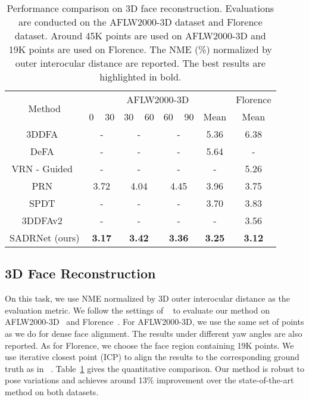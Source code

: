 \documentclass[journal]{IEEEtran}
\begin{document}
	
	\begin{table}[tbp]
		\caption{Performance comparison on 3D face reconstruction. Evaluations are conducted on the AFLW2000-3D dataset and Florence dataset. Around 45K points are used on AFLW2000-3D and 19K points are used on Florence.  The NME (\%) normalized by outer interocular distance are reported. The best results are highlighted in bold.}
		\begin{center}
			\begin{tabular}{|c|c|c|c|c|c|}
				\hline
				\multirow{2}{*}{Method}   &         \multicolumn{4}{c|}{AFLW2000-3D}         &  Florence  \\ \cline{2-6}
				&   0 ~ 30   &  30 ~ 60   &  60 ~ 90  &    Mean    &    Mean    \\ \hline
				3DDFA~\cite{3DDFA}     &     -      &     -      &     -     &    5.36    &    6.38    \\
				DeFA~\cite{defa_2017_ICCV} &     -      &     -      &     -     &    5.64    &     -      \\
				VRN - Guided~\cite{VRN}   &     -      &     -      &     -     &     -      &    5.26    \\
				PRN~\cite{PRN}       &    3.72    &    4.04    &   4.45    &    3.96    &    3.75    \\
				SPDT~\cite{semi_2019_ICCV} &     -      &     -      &     -     &    3.70    &    3.83    \\
				3DDFAv2~\cite{3ddfav2}   &     -      &     -      &     -     &     -      &    3.56    \\
				SADRNet (ours)       & {\bf 3.17} & {\bf 3.42} & {\bf3.36} & {\bf 3.25} & {\bf 3.12} \\ \hline
			\end{tabular}
			
		\end{center}
		\label{tab:reconstruction}
	\end{table}
	
	
	\subsection{3D Face Reconstruction}
	On this task, we use NME normalized by 3D outer interocular distance as the evaluation metric. We follow the settings of ~\cite{PRN} to evaluate our method on AFLW2000-3D~\cite{3DDFA} and Florence~\cite{florence}.
	For AFLW2000-3D, we use the same set of points as we do for dense face alignment. The results under different yaw angles are also reported. As for Florence, we choose the face region containing 19K points. We use iterative closest point (ICP) to align the results to the corresponding ground truth as in ~\cite{PRN}. Table~\ref{tab:reconstruction} gives the quantitative comparison.
	Our method is robust to pose variations and achieves around 13\% improvement over the state-of-the-art method on both datasets.
	
\end{document}

